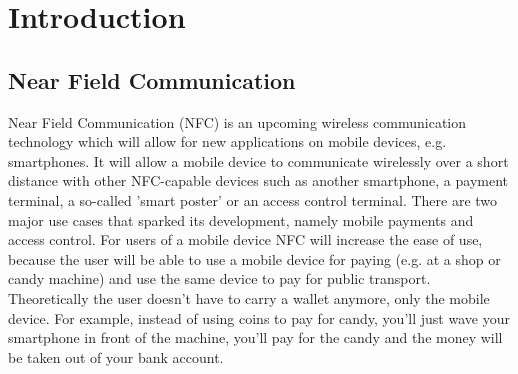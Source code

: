 \chapter{Introduction}


\section{Near Field Communication} %
Near Field Communication (NFC) is an upcoming wireless communication technology which will allow for new applications on mobile devices, e.g. smartphones.
It will allow a mobile device to communicate wirelessly over a short distance with other NFC-capable devices such as another smartphone, a payment terminal, a so-called 'smart poster' or an access control terminal.
There are two major use cases that sparked its development, namely mobile payments and access control. %
For users of a mobile device NFC will increase the ease of use, because the user will be able to use a mobile device for paying (e.g. at a shop or candy machine) and use the same device to pay for public transport.
Theoretically the user doesn't have to carry a wallet anymore, only the mobile device.
For example, instead of using coins to pay for candy, you'll just wave your smartphone in front of the machine, you'll pay for the candy and the money will be taken out of your bank account. 



